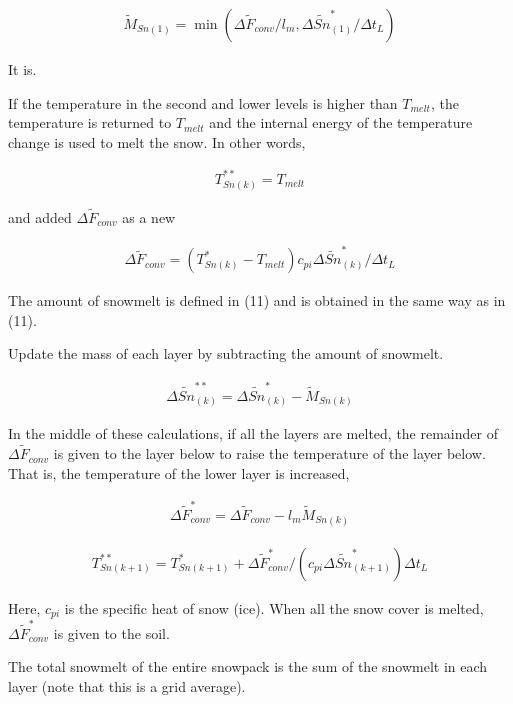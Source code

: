 \begin{eqnarray}
 \widetilde{M}_{Sn(1)} = \min(\Delta \widetilde{F}_{conv} / l_m, \Delta \widetilde{Sn}_{(1)}^*/\Delta t_L ) 
\end{eqnarray}

It is.

If the temperature in the second and lower levels is higher than
\(T_{melt}\), the temperature is returned to \(T_{melt}\) and the
internal energy of the temperature change is used to melt the snow. In
other words,

\begin{eqnarray}
 T_{Sn(k)}^{**} = T_{melt}
\end{eqnarray}

and added \(\Delta \widetilde{F}_{conv}\) as a new

\begin{eqnarray}
 \Delta \widetilde{F}_{conv} = ( T_{Sn(k)}^* - T_{melt} ) c_{pi}\Delta \widetilde{Sn}_{(k)}^*/\Delta t_L
\end{eqnarray}

The amount of snowmelt is defined in (11) and is obtained in the same
way as in (11).

Update the mass of each layer by subtracting the amount of snowmelt.

\begin{eqnarray}
 \Delta \widetilde{Sn}_{(k)}^{**} = \Delta \widetilde{Sn}_{(k)}^{*}
 - \widetilde{M}_{Sn(k)}
\end{eqnarray}

In the middle of these calculations, if all the layers are melted, the
remainder of \(\Delta \widetilde{F}_{conv}\) is given to the layer below
to raise the temperature of the layer below. That is, the temperature of
the lower layer is increased,

\begin{eqnarray}
 \Delta \widetilde{F}_{conv}^* = \Delta \widetilde{F}_{conv} - l_m \widetilde{M}_{Sn(k)}
\end{eqnarray}

\begin{eqnarray}
 T_{Sn(k+1)}^{**} = T_{Sn(k+1)}^{*} + \Delta \widetilde{F}_{conv}^* / (c_{pi} \Delta \widetilde{Sn}_{(k+1)}^*) \Delta t_L
\end{eqnarray}

Here, \(c_{pi}\) is the specific heat of snow (ice). When all the snow
cover is melted, \(\Delta \widetilde{F}_{conv}^*\) is given to the soil.

The total snowmelt of the entire snowpack is the sum of the snowmelt in
each layer (note that this is a grid average).


